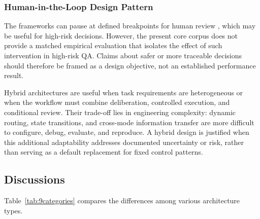 \subsubsection{Human-in-the-Loop Design Pattern}
\label{sec:hitl}

The frameworks can pause at defined breakpoints for human review
\citep{langgraph2024}, which may be useful for high-risk decisions. However,
the present core corpus does not provide a matched empirical evaluation that
isolates the effect of such intervention in high-risk QA. Claims about safer or
more traceable decisions should therefore be framed as a design objective, not
an established performance result.



Hybrid architectures are useful when task requirements are heterogeneous or when the workflow must combine deliberation, controlled execution, and conditional review. Their trade-off lies in engineering complexity: dynamic routing, state transitions, and cross-mode information transfer are more difficult to configure, debug, evaluate, and reproduce. A hybrid design is justified when this additional adaptability addresses documented uncertainty or risk, rather than serving as a default replacement for fixed control patterns.

\subsection{Discussions}
\label{sec:arch_comparison}

Table~\ref{tab:9categories} compares the differences among various architecture types. 

